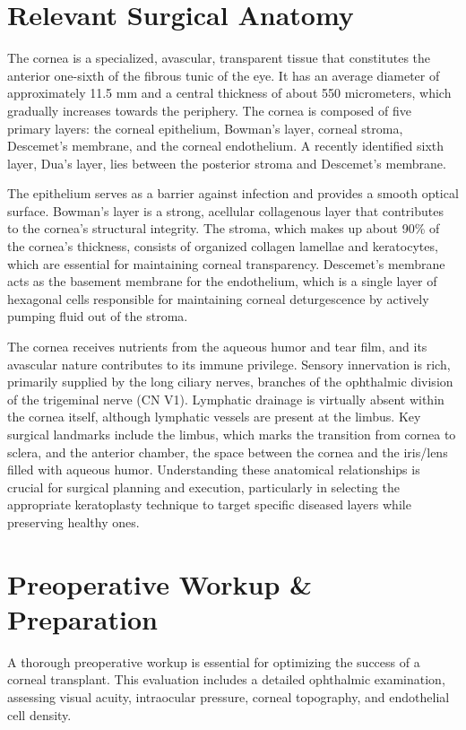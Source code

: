 \section*{Relevant Surgical Anatomy}
The cornea is a specialized, avascular, transparent tissue that constitutes the anterior one-sixth of the fibrous tunic of the eye. It has an average diameter of approximately 11.5 mm and a central thickness of about 550 micrometers, which gradually increases towards the periphery. The cornea is composed of five primary layers: the corneal epithelium, Bowman's layer, corneal stroma, Descemet's membrane, and the corneal endothelium. A recently identified sixth layer, Dua's layer, lies between the posterior stroma and Descemet's membrane. 

The epithelium serves as a barrier against infection and provides a smooth optical surface. Bowman's layer is a strong, acellular collagenous layer that contributes to the cornea's structural integrity. The stroma, which makes up about 90\% of the cornea's thickness, consists of organized collagen lamellae and keratocytes, which are essential for maintaining corneal transparency. Descemet's membrane acts as the basement membrane for the endothelium, which is a single layer of hexagonal cells responsible for maintaining corneal deturgescence by actively pumping fluid out of the stroma.

The cornea receives nutrients from the aqueous humor and tear film, and its avascular nature contributes to its immune privilege. Sensory innervation is rich, primarily supplied by the long ciliary nerves, branches of the ophthalmic division of the trigeminal nerve (CN V1). Lymphatic drainage is virtually absent within the cornea itself, although lymphatic vessels are present at the limbus. Key surgical landmarks include the limbus, which marks the transition from cornea to sclera, and the anterior chamber, the space between the cornea and the iris/lens filled with aqueous humor. Understanding these anatomical relationships is crucial for surgical planning and execution, particularly in selecting the appropriate keratoplasty technique to target specific diseased layers while preserving healthy ones.

\section*{Preoperative Workup \& Preparation}
A thorough preoperative workup is essential for optimizing the success of a corneal transplant. This evaluation includes a detailed ophthalmic examination, assessing visual acuity, intraocular pressure, corneal topography, and endothelial cell density.

